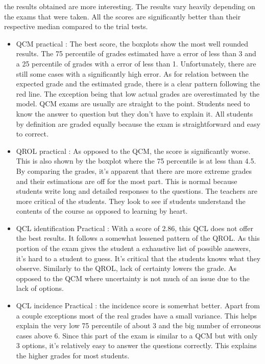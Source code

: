 \documentclass[a4paper,11pt]{report}
\numberwithin{figure}{section} %
\begin{document}
	the results obtained are more interesting.
	The results vary heavily depending on the exams that were taken.
	All the scores are significantly better than their respective median compared to the trial tests.
    \begin{itemize}
    \item[\textbullet]  QCM practical : The best score, the boxplots show the most well rounded results.
    The 75 percentile of grades estimated have a error of less than 3 and a 25 percentile of grades with a error of less than 1.
    Unfortunately, there are still some cases with a significantly high error.
    As for relation between the expected grade and the estimated grade, there is a clear pattern following the red line.
    The exception being that low actual grades are overestimated by the model.
    QCM exams are usually are straight to the point.
    Students need to know the answer to question but they don't have to explain it.
    All students by definition are graded equally because the exam is straightforward and easy to correct.
    \item[\textbullet]  QROL practical : As opposed to the QCM, the score is significantly worse.
    This is also shown by the boxplot where the 75 percentile is at less than 4.5. By comparing the grades, it's apparent that there are more extreme grades and their estimations are off for the most part.
    This is normal because students write long and detailed responses to the questions.
    The teachers are more critical of the students.
    They look to see if students understand the contents of the course as opposed to learning by heart.
    \item[\textbullet]  QCL identification Practical : With a score of 2.86, this QCL does not offer the best results.
    It follows a somewhat lessened pattern of the QROL. As this portion of the exam gives the student a exhaustive list of possible answers, it's hard to a student to guess.
    It's critical that the students knows what they observe.
    Similarly to the QROL, lack of certainty lowers the grade.
    As opposed to the QCM where uncertainty is not much of an issue due to the lack of options.
    \item[\textbullet]  QCL incidence Practical : the incidence score  is somewhat better.
    Apart from a couple exceptions most of the real grades have a small variance.
    This helps explain the very low 75 percentile of about 3 and the big number of erroneous cases above 6.
    Since this part of the exam is similar to a QCM but with only 3 options, it's relatively easy to answer the questions correctly.
    This explains the higher grades for most students.
    \end{itemize}
    
\end{document}
